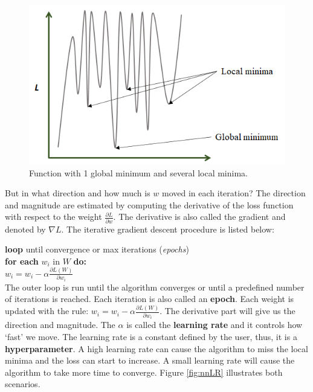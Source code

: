 \documentclass[
  11pt,
]{krantz}
\begin{document}
\begin{figure}

{\centering \includegraphics[width=0.5\linewidth]{images/nn_lm} 

}

\caption{Function with 1 global minimum and several local minima.}\label{fig:nnLM}
\end{figure}

But in what direction and how much is \(w\) moved in each iteration? The direction and magnitude are estimated by computing the derivative of the loss function with respect to the weight \(\frac{\partial L}{\partial w}\). The derivative is also called the gradient and denoted by \(\nabla L\). The iterative gradient descent procedure is listed below:

\textbf{loop} until convergence or max iterations (\emph{epochs})\\
\hspace*{0.333em}\hspace*{0.333em}\textbf{for each} \(w_i\) in \(W\) \textbf{do:}\\
\hspace*{0.333em}\hspace*{0.333em}\hspace*{0.333em}\hspace*{0.333em}\hspace*{0.333em}\(w_i = w_i - \alpha \frac{\partial L(W)}{\partial w_i}\)\\

The outer loop is run until the algorithm converges or until a predefined number of iterations is reached. Each iteration is also called an \textbf{epoch}. Each weight is updated with the rule: \(w_i = w_i - \alpha \frac{\partial L(W)}{\partial w_i}\). The derivative part will give us the direction and magnitude. The \(\alpha\) is called the \textbf{learning rate} and it controls how `fast' we move. The learning rate is a constant defined by the user, thus, it is a \textbf{hyperparameter}. A high learning rate can cause the algorithm to miss the local minima and the loss can start to increase. A small learning rate will cause the algorithm to take more time to converge. Figure \ref{fig:nnLR} illustrates both scenarios.
\end{document}
